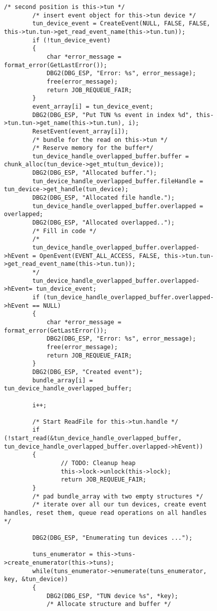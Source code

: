 \begin{figure}
\begin{lstlisting}[caption=Code für handle\_plain auf Windows]
        /* second position is this->tun */
        /* insert event object for this->tun device */
        tun_device_event = CreateEvent(NULL, FALSE, FALSE, this->tun.tun->get_read_event_name(this->tun.tun));
        if (!tun_device_event)
        {
            char *error_message = format_error(GetLastError());
            DBG2(DBG_ESP, "Error: %s", error_message);
            free(error_message);
            return JOB_REQUEUE_FAIR;
        }
        event_array[i] = tun_device_event;
        DBG2(DBG_ESP, "Put TUN %s event in index %d", this->tun.tun->get_name(this->tun.tun), i);
        ResetEvent(event_array[i]);
        /* bundle for the read on this->tun */
        /* Reserve memory for the buffer*/
        tun_device_handle_overlapped_buffer.buffer = chunk_alloc(tun_device->get_mtu(tun_device));
        DBG2(DBG_ESP, "Allocated buffer.");
        tun_device_handle_overlapped_buffer.fileHandle = tun_device->get_handle(tun_device);
        DBG2(DBG_ESP, "Allocated file handle.");
        tun_device_handle_overlapped_buffer.overlapped = overlapped;
        DBG2(DBG_ESP, "Allocated overlapped..");
        /* Fill in code */
        /*
        tun_device_handle_overlapped_buffer.overlapped->hEvent = OpenEvent(EVENT_ALL_ACCESS, FALSE, this->tun.tun->get_read_event_name(this->tun.tun));
        */
        tun_device_handle_overlapped_buffer.overlapped->hEvent= tun_device_event;
        if (tun_device_handle_overlapped_buffer.overlapped->hEvent == NULL)
        {
            char *error_message = format_error(GetLastError());
            DBG2(DBG_ESP, "Error: %s", error_message);
            free(error_message);
            return JOB_REQUEUE_FAIR;
        }
        DBG2(DBG_ESP, "Created event");
        bundle_array[i] = tun_device_handle_overlapped_buffer;

        i++;

        /* Start ReadFile for this->tun.handle */
        if (!start_read(&tun_device_handle_overlapped_buffer, tun_device_handle_overlapped_buffer.overlapped->hEvent))
        {
                // TODO: Cleanup heap
                this->lock->unlock(this->lock);
                return JOB_REQUEUE_FAIR;
        }
        /* pad bundle_array with two empty structures */
        /* iterate over all our tun devices, create event handles, reset them, queue read operations on all handles */

        DBG2(DBG_ESP, "Enumerating tun devices ...");

        tuns_enumerator = this->tuns->create_enumerator(this->tuns);
        while(tuns_enumerator->enumerate(tuns_enumerator, key, &tun_device))
        {
            DBG2(DBG_ESP, "TUN device %s", *key);
            /* Allocate structure and buffer */


\end{lstlisting}
\end{figure}
